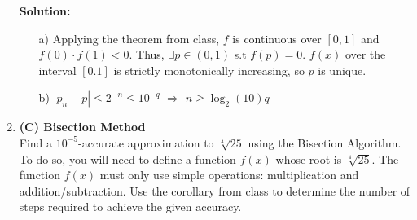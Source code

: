 \documentclass[12pt]{article}
\begin{document}
\begin{enumerate}[label=\bfseries Problem \arabic*:]
\begin{itemize}
    \end{itemize}
    
    \textbf{Solution:}

    \begin{itemize}
    \item[a)] Applying the theorem from class, $f$ is continuous over $[0,1]$ and $f(0) \cdot f(1)<0$. Thus, $\exists p\in(0,1)$ s.t $f(p)=0$. $f(x)$ over the interval $[0.1]$ is strictly monotonically increasing, so $p$ is unique.
    
    \item[b)] $|p_n-p|\le2^{-n}\le10^{-q}$ $\Rightarrow$ $n \ge \log_2(10)q$

    \end{itemize}
    
    \newpage
    \item \textbf{(C) Bisection Method}\\
    Find a $10^{-5}$-accurate approximation to $\sqrt[4]{25}$ using the Bisection Algorithm. To do so, you will need to define a function $f(x)$ whose root is $\sqrt[4]{25}$. The function $f(x)$ must only use simple operations: multiplication and addition/subtraction. Use the corollary from class to determine the number of steps required to achieve the given accuracy.
    

\end{enumerate}
\end{document}
